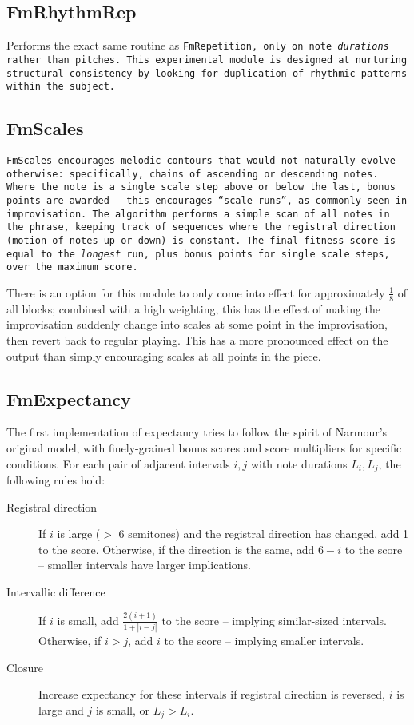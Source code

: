 \subsection{FmRhythmRep}

Performs the exact same routine as \tt{FmRepetition}, only on note \emph{durations} rather than pitches. This experimental module is designed at nurturing structural consistency by looking for duplication of rhythmic patterns within the subject.

\subsection{FmScales}

\tt{FmScales} encourages melodic contours that would not naturally evolve otherwise: specifically, chains of ascending or descending notes. Where the note is a single scale step above or below the last, bonus points are awarded -- this encourages ``scale runs'', as commonly seen in improvisation. The algorithm performs a simple scan of all notes in the phrase, keeping track of sequences where the registral direction (motion of notes up or down) is constant. The final fitness score is equal to the \emph{longest} run, plus bonus points for single scale steps, over the maximum score.

There is an option for this module to only come into effect for approximately $\frac{1}{8}$ of all blocks; combined with a high weighting, this has the effect of making the improvisation suddenly change into scales at some point in the improvisation, then revert back to regular playing. This has a more pronounced effect on the output than simply encouraging scales at all points in the piece.

\subsection{FmExpectancy}

The first implementation of expectancy tries to follow the spirit of Narmour's original model, with finely-grained bonus scores and score multipliers for specific conditions. For each pair of adjacent intervals $i, j$ with note durations $L_i, L_j$, the following rules hold:

\begin{description}
	\item[Registral direction] If $i$ is large ($>$ 6 semitones) and the registral direction has changed, add 1 to the score. Otherwise, if the direction is the same, add $6 - i$ to the score -- smaller intervals have larger implications.
	\item[Intervallic difference] If $i$ is small, add $\frac{2(i+1)}{1+|i - j|}$ to the score -- implying similar-sized intervals. Otherwise, if $i > j$, add $i$ to the score -- implying smaller intervals.
	\item[Closure] Increase expectancy for these intervals if registral direction is reversed, $i$ is large and $j$ is small, or $L_j > L_i$.
\end{description}


